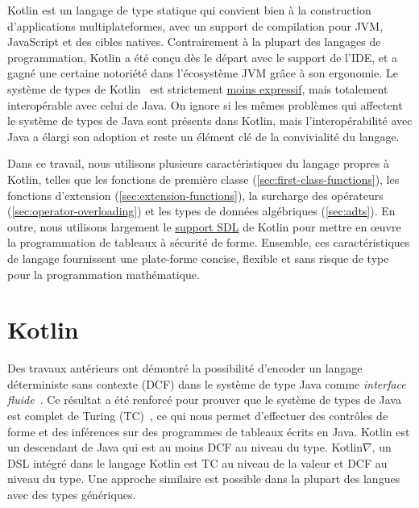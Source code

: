 Kotlin est un langage de type statique qui convient bien à la construction d'applications multiplateformes, avec un support de compilation pour JVM, JavaScript et des cibles natives. Contrairement à la plupart des langages de programmation, Kotlin a été conçu dès le départ avec le support de l'IDE, et a gagné une certaine notoriété dans l'écosystème JVM grâce à son ergonomie. Le système de types de Kotlin~\citep{tate2013mixed} est strictement \href{https://kotlinlang.org/docs/reference/generics.html#variance}{moins expressif}, mais totalement interopérable avec celui de Java. On ignore si les mêmes problèmes qui affectent le système de types de Java sont présents dans Kotlin, mais l'interopérabilité avec Java a élargi son adoption et reste un élément clé de la convivialité du langage.

Dans ce travail, nous utilisons plusieurs caractéristiques du langage propres à Kotlin, telles que les fonctions de première classe (\autoref{sec:first-class-functions}), les fonctions d'extension (\autoref{sec:extension-functions}), la surcharge des opérateurs (\autoref{sec:operator-overloading}) et les types de données algébriques (\autoref{sec:adts}). En outre, nous utilisons largement le \href{https://kotlinlang.org/docs/reference/type-safe-builders.html}{support SDL} de Kotlin pour mettre en œuvre la programmation de tableaux à sécurité de forme. Ensemble, ces caractéristiques de langage fournissent une plate-forme concise, flexible et sans risque de type pour la programmation mathématique.

\section{Kotlin\textorpdfstring{$\nabla$}}\label{sec:kotlingrad}

Des travaux antérieurs ont démontré la possibilité d'encoder un langage déterministe sans contexte (DCF) dans le système de type Java comme \textit{interface fluide}~\citep{gil2016formal, nakamaru2017silverchain}. Ce résultat a été renforcé pour prouver que le système de types de Java est complet de Turing (TC)~\citep{grigore2017java}, ce qui nous permet d'effectuer des contrôles de forme et des inférences sur des programmes de tableaux écrits en Java. Kotlin est un descendant de Java qui est au moins DCF au niveau du type. Kotlin$\nabla$, un DSL intégré dans le langage Kotlin est TC au niveau de la valeur et DCF au niveau du type. Une approche similaire est possible dans la plupart des langues avec des types génériques.

